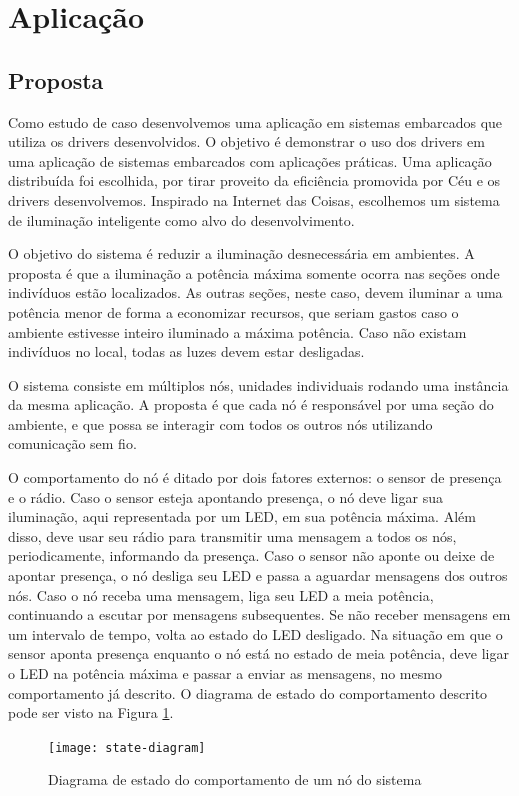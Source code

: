 \documentclass[11pt]{article}
\begin{document}
\section{Aplicação}
\subsection{Proposta}
\tab Como estudo de caso desenvolvemos uma aplicação em sistemas embarcados que utiliza os drivers desenvolvidos. O objetivo é demonstrar o uso dos drivers em uma aplicação de sistemas embarcados com aplicações práticas. Uma aplicação distribuída foi escolhida, por tirar proveito da eficiência promovida por Céu e os drivers desenvolvemos. Inspirado na Internet das Coisas, escolhemos um sistema de iluminação inteligente como alvo do desenvolvimento.
\par O objetivo do sistema é reduzir a iluminação desnecessária em ambientes. A proposta é que a iluminação a potência máxima somente ocorra nas seções onde indivíduos estão localizados. As outras seções, neste caso, devem iluminar a uma potência menor de forma a economizar recursos, que seriam gastos caso o ambiente estivesse inteiro iluminado a máxima potência. Caso não existam indivíduos no local, todas as luzes devem estar desligadas.
\par O sistema consiste em múltiplos nós, unidades individuais rodando uma instância da mesma aplicação. A proposta é que cada nó é responsável por uma seção do ambiente, e que possa se interagir com todos os outros nós utilizando comunicação sem fio.
\par O comportamento do nó é ditado por dois fatores externos: o sensor de presença e o rádio. Caso o sensor esteja apontando presença, o nó deve ligar sua iluminação, aqui representada por um LED, em sua potência máxima. Além disso, deve usar seu rádio para transmitir uma mensagem a todos os nós, periodicamente, informando da presença. Caso o sensor não aponte ou deixe de apontar presença, o nó desliga seu LED e passa a aguardar mensagens dos outros nós. Caso o nó receba uma mensagem, liga seu LED a meia potência, continuando a escutar por mensagens subsequentes. Se não receber mensagens em um intervalo de tempo, volta ao estado do LED desligado. Na situação em que o sensor aponta presença enquanto o nó está no estado de meia potência, deve ligar o LED na potência máxima e passar a enviar as mensagens, no mesmo comportamento já descrito. O diagrama de estado do comportamento descrito pode ser visto na Figura \ref{state-diagram}.
\begin{figure}
    \centering
    \texttt{[image: state-diagram]}
    \caption{Diagrama de estado do comportamento de um nó do sistema}
    \label{state-diagram}
\end{figure}
\end{document}
